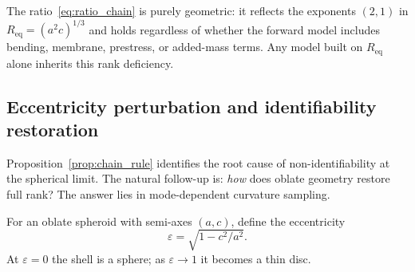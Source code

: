 \begin{remark}
The ratio~\eqref{eq:ratio_chain} is purely geometric: it reflects the exponents
$(2,1)$ in $R_\mathrm{eq} = (a^2 c)^{1/3}$ and holds regardless of whether the
forward model includes bending, membrane, prestress, or added-mass terms.  Any
model built on $R_\mathrm{eq}$ alone inherits this rank deficiency.
\end{remark}

\subsection{Eccentricity perturbation and identifiability restoration}\label{sec:perturbation}

Proposition~\ref{prop:chain_rule} identifies the root cause of
non-identifiability at the spherical limit.  The natural follow-up is:
\emph{how} does oblate geometry restore full rank?  The answer lies in
mode-dependent curvature sampling.

For an oblate spheroid with semi-axes $(a,c)$, define the eccentricity
\begin{equation}\label{eq:eccentricity}
  \varepsilon = \sqrt{1 - c^2/a^2}.
\end{equation}
At $\varepsilon = 0$ the shell is a sphere; as $\varepsilon \to 1$ it becomes a
thin disc.

